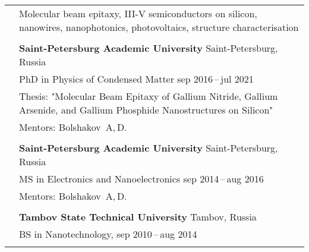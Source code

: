 \documentclass[letterpaper, 11pt]{article}
\begin{document}
	\begin{longtable}{p{1.3in}p{4.8in}}
		
		
		\nohyphens{\color{OliveGreen}{Research interests}}
		& Molecular beam epitaxy, III-V semiconductors on silicon, nanowires,
		nanophotonics, photovoltaics, structure characterisation\\
		& \\
		
		
		\color{OliveGreen}{Education}
		& \textbf{Saint-Petersburg Academic University} \hfill Saint-Petersburg, Russia \\
		& PhD in Physics of Condensed Matter \hfill sep 2016\,--\,jul 2021 \\
        & Thesis: "Molecular Beam Epitaxy of Gallium Nitride, Gallium Arsenide,
        and Gallium Phosphide Nanostructures on Silicon" \\
		& Mentors: Bolshakov~A,\,D.\\
		& \\
		
		& \textbf{Saint-Petersburg Academic University} \hfill Saint-Petersburg, Russia \\
		& MS in Electronics and Nanoelectronics \hfill sep 2014\,--\,aug 2016\\
		& Mentors: Bolshakov~A,\,D. \\
		& \\
		
		& \textbf{Tambov State Technical University} \hfill Tambov, Russia\\
		& BS in Nanotechnology, \hfill sep 2010\,--\,aug 2014\\
		& \\
		
		
		

\end{longtable}
\end{document}
